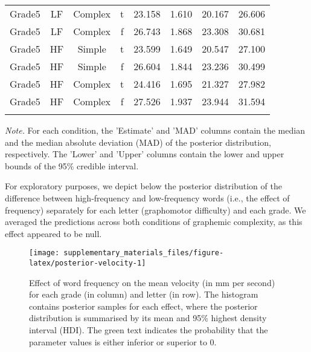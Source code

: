 \documentclass[
  11pt,
  english,
  ,doc,mask,floatsintext]{apa6}
\begin{document}
\begin{table}[htb]
\begin{center}
\begin{threeparttable}
{\begin{tabular}{cccccccc}
Grade5 & LF & Complex & t & 23.158 & 1.610 & 20.167 & 26.606\\
Grade5 & LF & Complex & f & 26.743 & 1.868 & 23.308 & 30.681\\
Grade5 & HF & Simple & t & 23.599 & 1.649 & 20.547 & 27.100\\
Grade5 & HF & Simple & f & 26.604 & 1.844 & 23.236 & 30.499\\
Grade5 & HF & Complex & t & 24.416 & 1.695 & 21.327 & 27.982\\
Grade5 & HF & Complex & f & 27.526 & 1.937 & 23.944 & 31.594\\
\bottomrule
\addlinespace
\end{tabular}

}

\begin{tablenotes}[para]
\normalsize{\textit{Note.} For each condition, the 'Estimate' and 'MAD' columns contain the
    median and the median absolute deviation (MAD) of the posterior distribution,
    respectively. The 'Lower' and 'Upper' columns contain the lower and upper
    bounds of the 95\% credible interval.}
\end{tablenotes}

\end{threeparttable}
\end{center}

\end{table}

For exploratory purposes, we depict below the posterior distribution of the difference between high-frequency and low-frequency words (i.e., the effect of frequency) separately for each letter (graphomotor difficulty) and each grade. We averaged the predictions across both conditions of graphemic complexity, as this effect appeared to be null.

\begin{figure}[!htb]

{\centering \texttt{[image: supplementary\_materials\_files/figure-latex/posterior-velocity-1]} 

}

\caption{Effect of word frequency on the mean velocity (in mm per second) for each grade (in column) and letter (in row). The histogram contains posterior samples for each effect, where the posterior distribution is summarised by its mean and 95\% highest density interval (HDI). The green text indicates the probability that the parameter values is either inferior or superior to 0.}\label{fig:posterior-velocity}
\end{figure}
\end{document}
